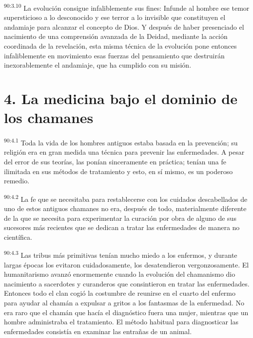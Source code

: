 \documentclass[twoside, 11pt]{book}
\begin{document}
\par
\textsuperscript{90:3.10} La evolución consigue infaliblemente sus fines: Infunde al hombre ese temor supersticioso a lo desconocido y ese terror a lo invisible que constituyen el andamiaje para alcanzar el concepto de Dios. Y después de haber presenciado el nacimiento de una comprensión avanzada de la Deidad, mediante la acción coordinada de la revelación, esta misma técnica de la evolución pone entonces infaliblemente en movimiento esas fuerzas del pensamiento que destruirán inexorablemente el andamiaje, que ha cumplido con su misión.

\section*{4. La medicina bajo el dominio de los chamanes}
\par
\textsuperscript{90:4.1} Toda la vida de los hombres antiguos estaba basada en la prevención; su religión era en gran medida una técnica para prevenir las enfermedades. A pesar del error de sus teorías, las ponían sinceramente en práctica; tenían una fe ilimitada en sus métodos de tratamiento y esto, en sí mismo, es un poderoso remedio.

\par
\textsuperscript{90:4.2} La fe que se necesitaba para restablecerse con los cuidados descabellados de uno de estos antiguos chamanes no era, después de todo, materialmente diferente de la que se necesita para experimentar la curación por obra de alguno de sus sucesores más recientes que se dedican a tratar las enfermedades de manera no científica.

\par
\textsuperscript{90:4.3} Las tribus más primitivas tenían mucho miedo a los enfermos, y durante largas épocas los evitaron cuidadosamente, los desatendieron vergonzosamente. El humanitarismo avanzó enormemente cuando la evolución del chamanismo dio nacimiento a sacerdotes y curanderos que consintieron en tratar las enfermedades. Entonces todo el clan cogió la costumbre de reunirse en el cuarto del enfermo para ayudar al chamán a expulsar a gritos a los fantasmas de la enfermedad. No era raro que el chamán que hacía el diagnóstico fuera una mujer, mientras que un hombre administraba el tratamiento. El método habitual para diagnosticar las enfermedades consistía en examinar las entrañas de un animal.
\end{document}
